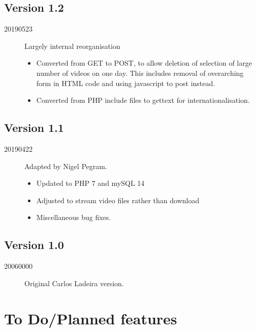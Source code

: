 \documentclass[12pt]{scrartcl} %
\begin{document}
	\subsection{Version 1.2}
		\begin{description}
			\item [20190523] Largely internal reorganisation
			\begin{itemize}
				\item Converted from GET to POST, to allow deletion of selection of large number of videos on one day. This includes removal of overarching form in HTML code and using javascript to post instead.
				\item Converted from PHP include files to gettext for internationalisation.
			\end{itemize}
		\end{description}

	\subsection{Version 1.1}
		\begin{description}
			\item [20190422] 	Adapted by Nigel Pegram.
			\begin{itemize}
				\item	Updated to PHP 7 and mySQL 14
				\item	Adjusted to stream video files rather than download
				\item	Miscellaneous bug fixes.
			\end{itemize}
		\end{description}

	\subsection{Version 1.0}
		\begin{description}
			\item [20060000] 	Original Carlos Ladeira version.
		\end{description}



\section{To Do/Planned features}
\end{document}

